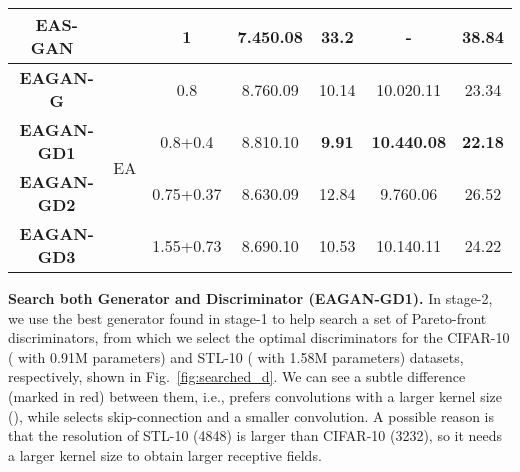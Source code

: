 \documentclass[runningheads]{llncs}
\begin{document}
\begin{table*}[!ht]
{\begin{tabular}{c|c|c|c|c|c|c}
        EAS-GAN~\cite{EAS-GAN} & & 1 & 7.450.08 & 33.2 & - & 38.84 \\\hline\hline
        \textbf{EAGAN-G} &\multirow{4}{*}{EA} & 0.8 &  8.760.09 & 10.14 & 10.020.11 &  23.34\\
        \textbf{EAGAN-GD1} & &0.8+0.4 & 8.810.10& \textbf{9.91}& \textbf{10.440.08}&\textbf{22.18}\\
        \textbf{EAGAN-GD2} & &0.75+0.37 & 8.630.09& 12.84& 9.760.06 & 26.52 \\
        \textbf{EAGAN-GD3} & &1.55+0.73 & 8.690.10& 10.53& 10.140.11&24.22\\
        \hline
    \end{tabular}
    }
    \caption{Results on the CIFAR-10 and STL-10 datasets.  indicates searching both generators (G) and discriminators (D).}
    \label{tab:results}
\end{table*}







\textbf{Search both Generator and Discriminator (EAGAN-GD1).} In stage-2, we use the best generator  found in stage-1 to help search a set of Pareto-front discriminators, from which we select the optimal discriminators for the CIFAR-10 ( with 0.91M parameters) and STL-10 ( with 1.58M parameters) datasets, respectively, shown in Fig.~\ref{fig:searched_d}. We can see a subtle difference (marked in red) between them, i.e.,  prefers convolutions with a larger kernel size (), while  selects skip-connection and a smaller convolution. A possible reason is that the resolution of STL-10 (4848) is larger than CIFAR-10 (3232), so it needs a larger kernel size to obtain larger receptive fields. 







\begin{figure*}[!h]
    \centering
{}
    \caption{The searched discriminators on CIFAR-10 (top) and STL-10 (bottom).}
    \label{fig:searched_d}
\end{figure*}
\end{document}
